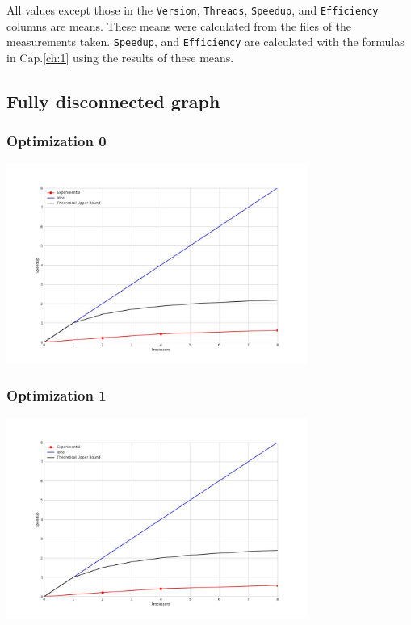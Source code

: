 All values except those in the \verb|Version|, \verb|Threads|, \verb|Speedup|, and \verb|Efficiency| columns are means. These means were calculated from the files of the measurements taken.
\verb|Speedup|, and \verb|Efficiency| are calculated with the formulas in Cap.\ref{ch:1} using the results of these means.

\clearpage
\subsection{Fully disconnected graph}
\subsubsection{Optimization 0}
\begin{center}
    \resizebox{0.8\textwidth}{!}{}
    \includegraphics[width=0.74\textwidth]{../img/speedup-graph_type-fully-disconnected-1000000-O0}
\end{center}

\subsubsection{Optimization 1}
\begin{center}
    \resizebox{0.8\textwidth}{!}{}
    \includegraphics[width=0.74\textwidth]{../img/speedup-graph_type-fully-disconnected-1000000-O1}
\end{center}

